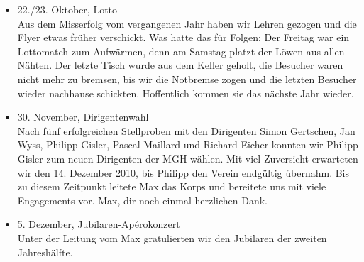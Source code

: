 \begin{history}
\begin{itemize}
        \item[]22./23. Oktober, Lotto\\
        Aus dem Misserfolg vom vergangenen Jahr haben wir Lehren gezogen und die
        Flyer etwas früher verschickt. Was hatte das für Folgen: Der Freitag war
        ein Lottomatch zum Aufwärmen, denn am Samstag platzt der Löwen aus allen
        Nähten. Der letzte Tisch wurde aus dem Keller geholt, die Besucher waren
        nicht mehr zu bremsen, bis wir die Notbremse zogen und die letzten
        Besucher wieder nachhause schickten. Hoffentlich kommen sie das nächste
        Jahr wieder.

        \item[]30. November, Dirigentenwahl\\
        Nach fünf erfolgreichen Stellproben mit den Dirigenten Simon Gertschen,
        Jan Wyss, Philipp Gisler, Pascal Maillard und Richard Eicher konnten wir
        Philipp Gisler zum neuen Dirigenten der MGH wählen. Mit viel Zuversicht
        erwarteten wir den 14. Dezember 2010, bis Philipp den Verein endgültig
        übernahm. Bis zu diesem Zeitpunkt leitete Max das Korps und bereitete
        uns mit viele Engagements vor. Max, dir noch einmal herzlichen Dank.

        \item[]5. Dezember, Jubilaren-Apérokonzert\\
        Unter der Leitung vom Max gratulierten wir den Jubilaren der zweiten
        Jahreshälfte.

    \end{itemize}

\end{history}
